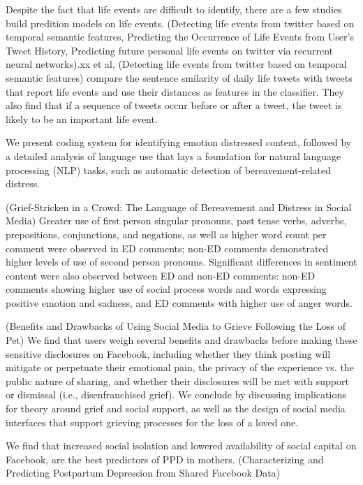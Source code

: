 Despite the fact that life events are difficult to identify, there are a few studies build predition models on life events. (Detecting life events from twitter based on temporal semantic features, Predicting the Occurrence of Life Events from User's Tweet History, Predicting future personal life events on twitter via recurrent neural networks).xx et al, (Detecting life events from twitter based on temporal semantic features) compare the sentence smilarity of daily life tweets with tweets that report life events and use their distances as features in the classifier. They also find that if a sequence of tweets occur before or after a tweet, the tweet is likely to be an important life event.




We present coding system for identifying emotion distressed content, followed by a detailed analysis of language use that lays a foundation for natural language processing (NLP) tasks, such as automatic detection of bereavement-related distress.

(Grief-Stricken in a Crowd: The Language of Bereavement and Distress in Social Media)
Greater use of first person singular pronouns, past tense verbs, adverbs, prepositions, conjunctions, and negations, as well as higher word count per comment were observed in ED comments; non-ED comments demonstrated higher levels of use of second person pronouns. Significant differences in sentiment content were also observed between ED and non-ED comments: non-ED comments showing higher use of social process words and words expressing positive emotion and sadness, and ED comments with higher use of anger words.

(Benefits and Drawbacks of Using Social Media to Grieve Following the Loss of Pet)
We find that users weigh several benefits and drawbacks before making these sensitive disclosures on Facebook, including whether they think posting will mitigate or perpetuate their emotional pain, the privacy of the experience vs. the public nature of sharing, and whether their disclosures will be met with support or dismissal (i.e., disenfranchised grief). We conclude by discussing implications for theory around grief and social support, as well as the design of social media interfaces that support grieving processes for the loss of a loved one.

We find that increased social isolation and lowered availability of social capital on Facebook, are the best predictors of PPD in mothers. (Characterizing and Predicting Postpartum Depression from Shared Facebook Data)

